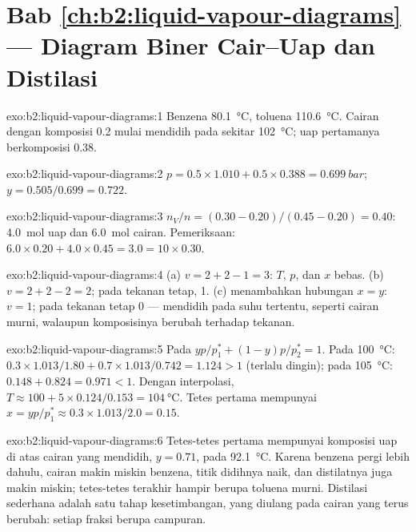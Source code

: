\section*{Bab \ref{ch:b2:liquid-vapour-diagrams} --- Diagram Biner Cair--Uap dan Distilasi}

\begin{solution}{exo:b2:liquid-vapour-diagrams:1}
Benzena \qty{80.1}{\degreeCelsius}, toluena \qty{110.6}{\degreeCelsius}.
Cairan dengan komposisi 0.2 mulai mendidih pada sekitar
\qty{102}{\degreeCelsius}; uap pertamanya berkomposisi 0.38.
\end{solution}

\begin{solution}{exo:b2:liquid-vapour-diagrams:2}
$p = 0.5 \times 1.010 + 0.5 \times 0.388 = \qty{0.699}{bar}$;
$y = 0.505/0.699 = 0.722$.
\end{solution}

\begin{solution}{exo:b2:liquid-vapour-diagrams:3}
$n_V/n = (0.30 - 0.20)/(0.45 - 0.20) = 0.40$: \qty{4.0}{mol} uap dan
\qty{6.0}{mol} cairan. Pemeriksaan: $6.0 \times 0.20 + 4.0 \times 0.45 = 3.0 = 10
\times 0.30$.
\end{solution}

\begin{solution}{exo:b2:liquid-vapour-diagrams:4}
(a) $v = 2 + 2 - 1 = 3$: $T$, $p$, dan $x$ bebas. (b) $v = 2 + 2 - 2 = 2$;
pada tekanan tetap, 1. (c)  menambahkan hubungan $x = y$: $v = 1$;
pada tekanan tetap 0 ---  mendidih pada suhu tertentu, seperti
cairan murni, walaupun komposisinya berubah terhadap tekanan.
\end{solution}

\begin{solution}{exo:b2:liquid-vapour-diagrams:5}
Pada  $yp/p_1^* + (1 - y)p/p_2^* = 1$. Pada
\qty{100}{\degreeCelsius}: $0.3 \times 1.013/1.80 + 0.7 \times 1.013/0.742 = 1.124 > 1$ (terlalu dingin); pada \qty{105}{\degreeCelsius}:
$0.148 + 0.824 = 0.971 < 1$. Dengan interpolasi, $T \approx
100 + 5 \times 0.124/0.153 = \qty{104}{\degreeCelsius}$. Tetes pertama
mempunyai $x =
yp/p_1^* \approx 0.3 \times 1.013/2.0 = 0.15$.
\end{solution}

\begin{solution}{exo:b2:liquid-vapour-diagrams:6}
Tetes-tetes pertama mempunyai komposisi uap di atas cairan yang mendidih,
$y = 0.71$, pada \qty{92.1}{\degreeCelsius}. Karena benzena pergi lebih
dahulu, cairan makin miskin benzena, titik didihnya naik, dan distilatnya
juga makin miskin; tetes-tetes terakhir hampir berupa toluena murni.
Distilasi sederhana adalah satu tahap kesetimbangan, yang diulang pada
cairan yang terus berubah: setiap fraksi berupa campuran.
\end{solution}

